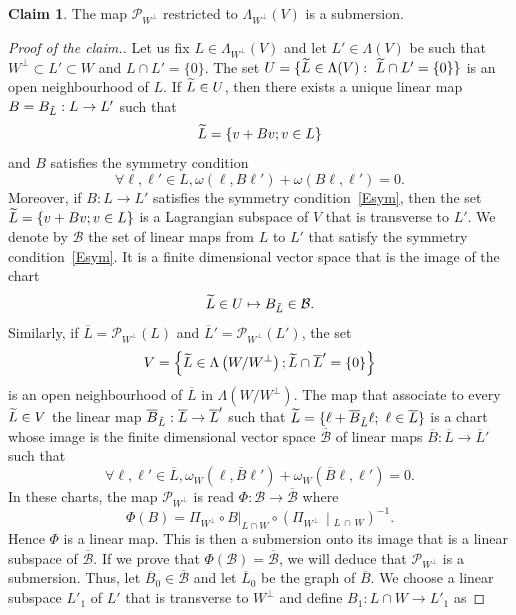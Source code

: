 \documentclass[10pt,a4paper]{amsart}
\numberwithin{equation}{section}
\renewcommand*\P{\mathcal{P}}
\newcommand*\cb{\mathcal{B}}
\let\oldtilde\tilde
\renewcommand*{\tilde}[1]{\mathchoice{\widetilde{#1}}{\widetilde{#1}}{\oldtilde{#1}}{\oldtilde{#1}}}
\let\oldforall\forall
\renewcommand*{\forall}{\mathrel{\oldforall}}
\theoremstyle{definition}
\newtheorem{claim}[theo]{Claim}
\theoremstyle{remark}
\newenvironment{enonce}[1]{\begin{claim}}{\end{claim}}
\begin{document}
\begin{enonce}{Claim}
The map $\P_{W^\perp}$ restricted to $\Lambda_{W^\perp}(V)$ is a submersion.
\end{enonce}
\begin{proof}[Proof of the claim.]
Let us fix $L\in\Lambda_{W^\perp}(V)$ and let $L'\in\Lambda(V)$ be such that $W^\perp\subset L'\subset W$ and $L\cap L'=\{0\}$. The set $U=\{ \tilde L\in\Lambda(V) :\ \tilde L\cap L'=\{0\} \}$ is an open neighbourhood of $L$. If $\tilde L\in U$, then there exists a unique linear map $B=B_{\tilde L}: L\to L'$ such that
\[
\tilde L=\{ v+Bv; v\in L\}
\]
and $B$ satisfies the symmetry condition
\begin{equation}\label{Esym}
\forall \ell, \ell'\in L, \omega(\ell, B\ell')+\omega(B\ell, \ell')=0.
\end{equation}
Moreover, if $B:L\to L'$ satisfies the symmetry condition~\eqref{Esym}, then the set $\tilde L=\{ v+Bv; v\in L\}$ is a Lagrangian subspace of $V$ that is transverse to $L'$.\newline
We denote by $\cb$ the set of linear maps from $L$ to $L'$ that satisfy the symmetry condition~\eqref{Esym}. It is a finite dimensional vector space that is the image of the chart
\[
\tilde L\in U\mapsto B_{\tilde L}\in \cb.
\]
Similarly, if $\overline{L}=\P_{W^\bot}(L)$ and $\overline{L}'=\P_{W^\bot}(L')$, the set
\[
V=\left\{\tilde L\in \Lambda\left(W/W^\bot\right); \tilde L\cap \overline{L}'=\{ 0\}\right\}
\]
is an open neighbourhood of $\overline{L}$ in $\Lambda(W/W^\bot)$. The map that associate to every $\tilde L\in V$ the linear map $\overline B_{\tilde L}:\overline{L}\to \overline{L}'$ such that $\tilde L=\{\ell+\overline B_{\tilde L}\ell;\ \ell\in\overline L\}$ is a chart whose image is the finite dimensional vector space $\overline{\cb}$ of linear maps $\overline B:\overline{L}\to \overline{L}'$ such that
\[
\forall \ell, \ell'\in \overline{L},\omega_W(\ell, \overline B\ell')+\omega_W(\overline B\ell, \ell')=0.
\]
In these charts, the map $\P_{W^\bot}$ is read $\Phi: \cb\to\overline{\cb} $ where
\[
\Phi(B)=\Pi_{W^\perp}\circ B|_{L\cap W}\circ \left(\Pi_{W^\perp}\,\middle|_{L\,\cap\,W}\right)^{-1}.
\]
Hence $\Phi$ is a linear map. This is then a submersion onto its image that is a linear subspace of $\overline{\cb}$. If we prove that $\Phi(\cb)=\overline{\cb}$, we will deduce that $\P_{W^\bot}$ is a submersion. Thus, let $\overline{B}_0\in \overline{\cb}$ and let $\overline{L}_0$ be the graph of $\overline{B}$. We choose a linear subspace $L'_1$ of $L'$ that is transverse to $W^\bot$ and define $B_1:L\cap W\to L'_1$ as

\end{proof}
\end{document}
